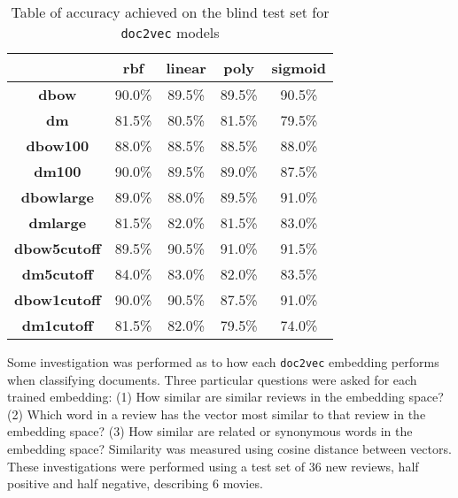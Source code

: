 \documentclass[twocolumn]{article}
\begin{document}
\begin{table*}[]
\centering
\captionsetup{justification=centering}
\caption{Table of accuracy achieved on the blind test set for \texttt{doc2vec} models}
\label{table:doc2vecaccs}
\begin{tabular}{|c|c|c|c|c|}
\hline
                     & \textbf{rbf} & \textbf{linear} & \textbf{poly} & \textbf{sigmoid} \\ \hline
\textbf{dbow}        & 90.0\%       & 89.5\%          & 89.5\%        & 90.5\%                \\ \hline
\textbf{dm}          & 81.5\%       & 80.5\%          & 81.5\%        & 79.5\%               \\ \hline
\textbf{dbow100}     & 88.0\%       & 88.5\%          & 88.5\%        & 88.0\%                \\ \hline
\textbf{dm100}       & 90.0\%       & 89.5\%          & 89.0\%        & 87.5\%                \\ \hline
\textbf{dbowlarge}   & 89.0\%       & 88.0\%          & 89.5\%        & 91.0\%                \\ \hline
\textbf{dmlarge}     & 81.5\%       & 82.0\%          & 81.5\%        & 83.0\%                \\ \hline
\textbf{dbow5cutoff} & 89.5\%       & 90.5\%          & 91.0\%        & 91.5\%                \\ \hline
\textbf{dm5cutoff}   & 84.0\%       & 83.0\%          & 82.0\%        & 83.5\%                \\ \hline
\textbf{dbow1cutoff} & 90.0\%       & 90.5\%          & 87.5\%        & 91.0\%                \\ \hline
\textbf{dm1cutoff}   & 81.5\%       & 82.0\%          & 79.5\%        & 74.0\%                \\ \hline
\end{tabular}
\end{table*}


Some investigation was performed as to how each \texttt{doc2vec} embedding performs when classifying documents. Three particular questions were asked for each trained embedding: (1) How similar are similar reviews in the embedding space? (2) Which word in a review has the vector most similar to that review in the embedding space? (3) How similar are related or synonymous words in the embedding space? Similarity was measured using cosine distance between vectors. These investigations were performed using a test set of 36 new reviews, half positive and half negative, describing 6 movies.
\end{document}
